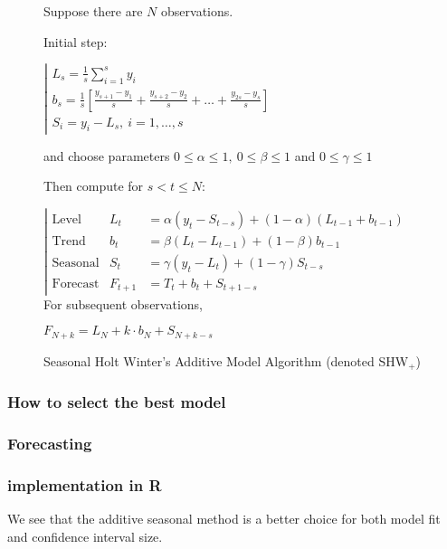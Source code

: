 \begin{figure}[H]
\begin{tcolorbox}[width=.6\textwidth]%

Suppose there are $N$ observations.

Initial step:

$\left|\begin{array}{l}
L_s = \frac1s \sum_{i=1}^s y_i \\
b_s = \frac1s \left[\frac{y_{s+1}-y_1}{s}+\frac{y_{s+2}-y_2}{s}+\dots+\frac{y_{2s}-y_s}{s}\right]\\
S_i  = y_i-L_s, \ i=1,\dots,s
\end{array}\right.$

and choose parameters $0\leq\alpha\leq1,\ 0\leq\beta\leq1$ and $0\leq\gamma\leq1$

Then compute for $s<t\leq N$:

$\left|\begin{array}{lll}
\text{Level} &       L_t & = \alpha (y_t-S_{t-s})+(1-\alpha)(L_{t-1}+b_{t-1})\\
\text{Trend} &      b_t & = \beta(L_t-L_{t-1})+(1-\beta)b_{t-1}\\
\text{Seasonal} & S_t & = \gamma (y_t-L_t) + (1-\gamma)S_{t-s}\\
\text{Forecast} & F_{t+1} & = T_t+b_t+S_{t+1-s}
\end{array}\right.$
For subsequent observations,

$F_{N+k}=L_N+k\cdot b_N+S_{N+k-s}$
\label{SHWx}
\end{tcolorbox}
\caption{Seasonal Holt Winter’s Additive Model Algorithm (denoted SHW$_{+}$)}
\end{figure}


\subsubsection{How to select the best model}

\subsubsection{Forecasting}

\subsubsection{implementation in R}


We see that the additive seasonal method is a better choice for both model fit and confidence interval size.

